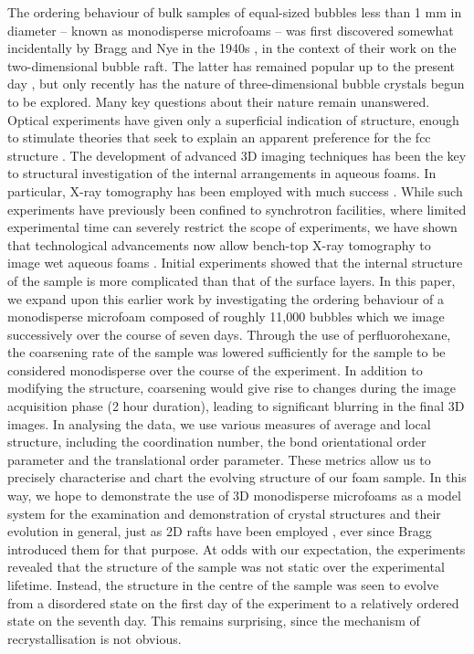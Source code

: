 \documentclass[10pt,a4paper]{article}
\begin{document}
The ordering behaviour of bulk samples of equal-sized bubbles less than 1 mm in diameter -- known as monodisperse microfoams -- 
was first discovered somewhat incidentally by Bragg and Nye in the 1940s \cite{Bragg47}, in the context of their work on the two-dimensional  bubble raft. The latter has remained popular up to the present day \cite{Tolen86,Gouldstone2001,doi:10.1080/01418610208235711}, but only recently has the nature of three-dimensional bubble crystals begun to be explored. Many key questions about their nature remain unanswered. 
Optical experiments \cite{HohlerEtal08,VanderNet06,vanderNetEtal07} have given only a superficial indication  of structure, enough to stimulate theories that seek to explain an apparent preference for the fcc structure \cite{Heitkam2012}. 
The development of advanced 3D imaging techniques has been the key to structural investigation of the internal arrangements in aqueous foams. In particular, X-ray tomography has been employed with much success \cite{lambert2007experimental,Stocco_etal2011}. While such experiments have previously been confined to synchrotron facilities, where limited experimental time can severely restrict the scope of experiments, we have shown that technological advancements now allow bench-top X-ray tomography to image wet aqueous foams \cite{Meagher2011}. Initial experiments showed that the internal structure of the sample is more complicated than that of the surface layers. 
In this paper, we expand upon this earlier work by investigating the ordering behaviour of a monodisperse microfoam composed of roughly 11,000 bubbles which we image successively over the course of seven days. Through the use of perfluorohexane, the coarsening rate of the sample was lowered sufficiently for the sample to be considered monodisperse over the course of the experiment. In addition to modifying the structure, coarsening would give rise to changes during the image acquisition phase (2 hour duration), leading to significant blurring in the final 3D images. 
In analysing the data, we use various measures of average and local structure, including the coordination number, the bond orientational order parameter and the translational order parameter. These metrics allow us to precisely characterise and chart the evolving structure of our foam sample. In this way, we hope to demonstrate the use of 3D monodisperse microfoams as a model system for the examination and demonstration of crystal structures and their evolution in general, just as 2D rafts have been employed \cite{Bragg47}, ever since Bragg introduced them for that purpose. 
At odds with our expectation, the experiments revealed that the structure of the sample was not static over the experimental lifetime. Instead, the structure in the centre of the sample was seen to evolve from a disordered state on the first day of the experiment to a relatively ordered state on the seventh day. This remains surprising, since the mechanism of recrystallisation is not obvious.
\end{document}

